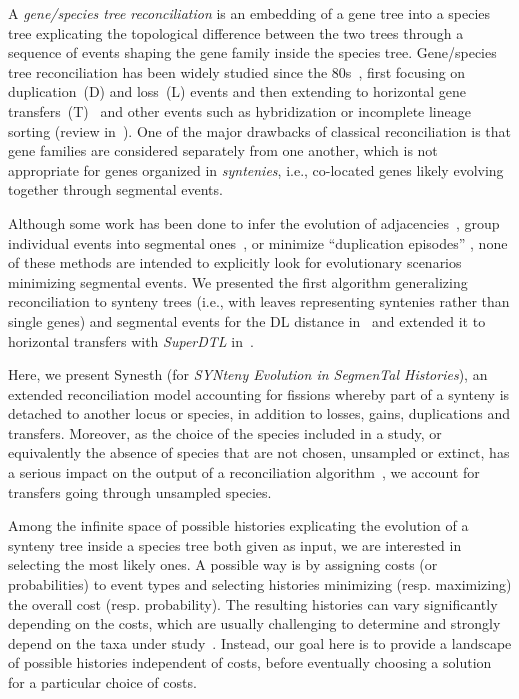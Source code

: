 A \emph{gene/species tree reconciliation} is an embedding of a gene tree into a species tree explicating the topological difference between the two trees through a sequence of events shaping the gene family inside the species tree.
Gene/species tree reconciliation has been widely studied since the 80s~\parencite{Goodman1979FittingGeneLineage}, first focusing on duplication~(D) and loss~(L) events and then extending to horizontal gene transfers~(T)~\parencite{Bansal2012EfficientAlgorithmsReconciliation,Donati2015EfficientTreeReconciliation,Tofigh2011SimultaneousIdentificationDuplications} and other events such as hybridization or incomplete lineage sorting (review in~\textcite{ElMabrouk2019GeneFamilyEvolution}). One of the major drawbacks of classical reconciliation is that gene families are considered separately from one another, which is not appropriate for genes organized in \emph{syntenies}, i.e., co-located genes likely evolving together through segmental events.

Although some work has been done to infer the evolution of adjacencies~\parencite{Duchemin2017DecostarReconstructingAncestral}, group individual events into segmental ones~\parencite{Duchemin2017PhylogenyDependenciesDependencies}, or minimize \enquote{duplication episodes} \parencite{Dondi2019ReconcilingMultipleGenes,Paszek2018EfficientAlgorithmsGenomic}, none of these methods are intended to explicitly look for evolutionary scenarios minimizing segmental events. We presented the first algorithm generalizing reconciliation to synteny trees (i.e., with leaves representing syntenies rather than single genes) and segmental events for the DL distance in~\textcite{Delabre2020EvolutionSegmentalDuplications} and extended it to horizontal transfers with \emph{SuperDTL} in~\textcite{Anselmetti2022ReconciliationSegmentalDuplication}.

Here, we present Synesth (for \emph{SYNteny Evolution in SegmenTal Histories}), an extended reconciliation model accounting for fissions whereby part of a synteny is detached to another locus or species, in addition to losses, gains, duplications and transfers.
Moreover, as the choice of the species included in a study, or equivalently the absence of species that are not chosen, unsampled or extinct, has a serious impact on the output of a reconciliation algorithm~\parencite{Jacox2016EcceteraComprehensiveGene,Szoelloesi2013LateralGeneTransfer,Weiner2021ImprovedDuplicationTransfer}, we account for transfers going through unsampled species. 

Among the infinite space of possible histories explicating the evolution of a synteny tree inside a species tree both given as input, we are interested in selecting the most likely ones.
A possible way is by assigning costs (or probabilities) to event types and selecting histories minimizing (resp. maximizing) the overall cost (resp. probability).
The resulting histories can vary significantly depending on the costs, which are usually challenging to determine and strongly depend on the taxa under study~\parencite{LibeskindHadas2014ParetoOptimalPhylogenetic,David2011RapidEvolutionaryInnovation}.
Instead, our goal here is to provide a landscape of possible histories independent of costs, before eventually choosing a solution for a particular choice of costs.

